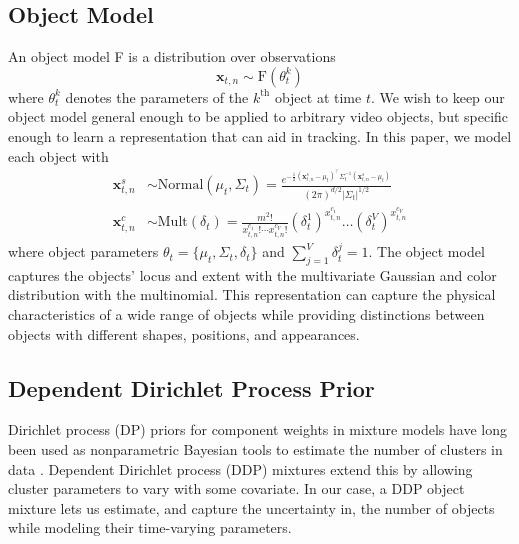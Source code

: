\documentclass{article}
\begin{document}
\subsection{Object Model}
An object model F is a distribution over observations
\begin{equation}
    \mathbf{x}_{t,n} \sim \text{F}(\theta_t^k)
\end{equation}
where $\theta_t^k$ denotes the parameters of the $k^{\text{th}}$ object at time $t$. We wish to keep our object model general enough to be applied to arbitrary video objects, but specific enough to learn a representation that can aid in tracking. In this paper, we model each object with
\begin{align}
    \mathbf{x}^s_{t,n} &\sim \text{Normal}(\mu_t,\Sigma_t)
    = \frac{e^{-\frac{1}{2}(\mathbf{x}^s_{t,n} - \mu_t)^{\top} \Sigma_t^{-1} (\mathbf{x}^s_{t,n} - \mu_t)}}
        {(2\pi)^{d/2}|\Sigma_t|^{1/2}}\\
        \mathbf{x}^c_{t,n} &\sim \text{Mult}(\delta_t)
        = \frac{m^2!}{x^{c_1}_{t,n}! \cdots x^{c_{V}}_{t,n}!}(\delta_t^1)^{x^{c_1}_{t,n}} \ldots (\delta_t^{V})^{x^{c_{V}}_{t,n}}
\end{align}
where object parameters $\theta_t = \{ \mu_t, \Sigma_t, \delta_t \}$ and $\sum_{j=1}^{V} \delta_t^j = 1$. The object model captures the objects' locus and extent with the multivariate Gaussian and color distribution with the multinomial. This representation can capture the physical characteristics of a wide range of objects while providing distinctions between objects with different shapes, positions, and appearances.


\subsection{Dependent Dirichlet Process Prior}
Dirichlet process (DP) priors for component weights in mixture models have long been used as nonparametric Bayesian tools to estimate the number of clusters in data \cite{antoniak1974mixtures}. Dependent Dirichlet process (DDP) mixtures extend this by allowing cluster parameters to vary with some covariate. In our case, a DDP object mixture lets us estimate, and capture the uncertainty in, the number of objects while modeling their time-varying parameters.
\end{document}
